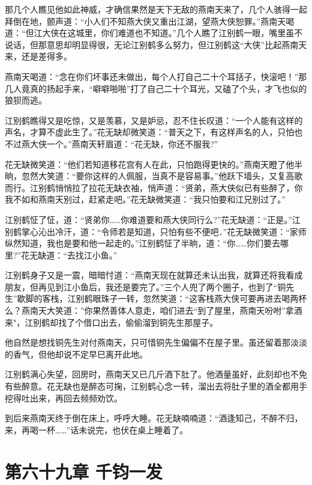 \documentclass[12pt,oneside]{book}
\begin{document}
那几个人瞧见他如此神威，才确信果然是天下无敌的燕南天来了，几个人骇得一起拜倒在地，颤声道：``小人们不知燕大侠又重出江湖，望燕大侠恕罪。''燕南天喝道：``但江大侠在这城里，你们难道也不知道。''几个人瞧了江别鹤一眼，嘴里虽不说话，但那意思却明显得很，无论江别鹤多么努力，但江别鹤这``大侠''比起燕南天来，还是差得多。

燕南天喝道：``念在你们坏事还未做出，每个人打自己二十个耳括子，快滚吧！''那几人竟真的扬起手来，``噼噼啪啪''打了自己二十个耳光，又磕了个头，才飞也似的狼狈而逃。

江别鹤瞧得又是吃惊，又是羡慕，又是妒忌，忍不住长叹道：``一个人能有这样的声名，才算不虚此生了。''花无缺却微笑道：``普天之下，有这样声名的人，只怕也不过燕大侠一个。''燕南天轩眉道：``花无缺，你还不服我?''

花无缺微笑道：``他们若知道移花宫有人在此，只怕跑得更快的。''燕南天瞪了他半晌，忽然大笑道：``要你这样的人佩服，当真不是容易事。''他跃下墙头，又复高歌而行。江别鹤悄悄拉了拉花无缺衣袖，悄声道：``贤弟，燕大侠似已有些醉了，你我不如和燕南天别过，赶紧走吧。''花无缺微笑道：``我只怕要和江兄别过了。''

江别鹤怔了怔，道：``贤弟你\ldots\ldots 你难道要和燕大侠同行么?''花无缺道：``正是。''江别鹤掌心沁出冷汗，道：``令师若是知道，只怕有些不便吧．''花无缺微笑道：``家师纵然知道，我也是要和他一起走的。''江别鹤怔了半晌，道：``你\ldots\ldots 你们要去哪里?''花无缺道：``去找江小鱼。''

江别鹤身子又是一震，暗暗忖道：``燕南天现在就算还未认出我，就算还将我看成朋友，但再见到江小鱼后，我还是要完了。''三个人兜了两个圈子，也到了``铜先生''歇脚的客栈，江别鹤眼珠子一转，忽然笑道：``这客栈燕大侠可要再进去喝两杯么？燕南天大笑道：''你果然善体人意走，咱们进去``到了屋里，燕南天吩咐''拿酒来"，江别鹤却找了个借口出去，偷偷溜到铜先生那屋子。

他自然是想找铜先生对付燕南天，只可惜铜先生偏偏不在屋子里。虽还留着那淡淡的香气，但他却说不定早巳离开此地。

江别鹤满心失望，回房时，燕南天又已几斤酒下肚了。他酒量虽好，此刻却也不免有些醉意。花无缺也是醉态可掬，江别鹤心念一转，溜出去将肚子里的酒全都用手挖得吐出来，再回去频频劝饮。

到后来燕南天终于倒在床上，呼呼大睡。花无缺喃喃道：``酒逢知己，不醉不归，来，再喝一杯\ldots\ldots{}''话未说完，也伏在桌上睡着了。

\hypertarget{ux7b2cux516dux5341ux4e5dux7ae0-ux5343ux94a7ux4e00ux53d1}{%
\chapter{第六十九章
千钧一发}\label{ux7b2cux516dux5341ux4e5dux7ae0-ux5343ux94a7ux4e00ux53d1}}
\end{document}
